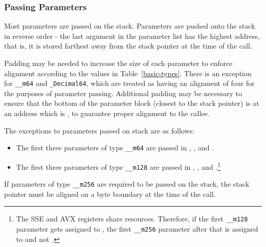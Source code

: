 \subsubsection{Passing Parameters}

Most parameters are passed on the stack. Parameters are pushed onto the
stack in reverse order - the last argument in the parameter list has the
highest address, that is, it is stored farthest away from the stack pointer
at the time of the call.

Padding may be needed to increase the size of each parameter to enforce
alignment according to the values in Table~\ref{basic-types}.  There is
an exception for \texttt{__m64} and \texttt{_Decimal64}, which are treated
as having an
alignment of four for the purposes of parameter passing.  Additional
padding may be necessary to ensure that the bottom of the parameter block
(closest to the stack pointer) is at an address which is ,
to guarantee proper alignment to the callee.

The exceptions to parameters passed on stack are as follows:
\begin{itemize}
  \item The first three parameters of type \texttt{__m64} are passed in
	, , and .
  \item The first three parameters of type \texttt{__m128} are passed in
	, , and .\footnote{The SSE and AVX
	registers share resources. Therefore, if the first \texttt{__m128}
	parameter gets assigned to  , the first \texttt{__m256}
	parameter after that is assigned to  and not
	.}
\end{itemize}

If parameters of type \texttt{__m256} are required to be passed on the
stack, the stack pointer must be aligned on a  byte boundary
at the time of the call.

